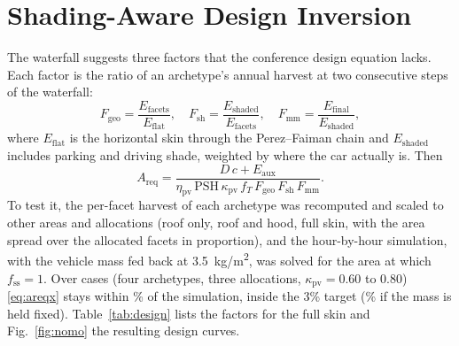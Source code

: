 \documentclass[lettersize,journal]{IEEEtran}
\newcommand{\fss}{f_{\mathrm{ss}}}
\newcommand{\Fgeo}{F_{\mathrm{geo}}}
\newcommand{\Fsh}{F_{\mathrm{sh}}}
\newcommand{\Fmm}{F_{\mathrm{mm}}}
\begin{document}
\section{Shading-Aware Design Inversion}
\label{sec:design}
The waterfall suggests three factors that the conference design equation lacks. Each factor is the ratio of an archetype's annual harvest at two consecutive steps of the waterfall:
\begin{equation}
\Fgeo=\frac{E_{\mathrm{facets}}}{E_{\mathrm{flat}}},\quad
\Fsh=\frac{E_{\mathrm{shaded}}}{E_{\mathrm{facets}}},\quad
\Fmm=\frac{E_{\mathrm{final}}}{E_{\mathrm{shaded}}},
\label{eq:factors}
\end{equation}
where $E_{\mathrm{flat}}$ is the horizontal skin through the Perez--Faiman chain and $E_{\mathrm{shaded}}$ includes parking and driving shade, weighted by where the car actually is. Then
\begin{equation}
A_{\mathrm{req}}=\frac{D\,c+E_{\mathrm{aux}}}{\eta_{\mathrm{pv}}\,\mathrm{PSH}\,\kappa_{\mathrm{pv}}\,f_T\,\Fgeo\,\Fsh\,\Fmm}.
\label{eq:areqx}
\end{equation}
To test it, the per-facet harvest of each archetype was recomputed and scaled to other areas and allocations (roof only, roof and hood, full skin, with the area spread over the allocated facets in proportion), and the hour-by-hour simulation, with the vehicle mass fed back at \SI{3.5}{kg/m^2}, was solved for the area at which $\fss=1$. Over \EsevenN{} cases (four archetypes, three allocations, $\kappa_{\mathrm{pv}}=0.60$ to 0.80) \eqref{eq:areqx} stays within \EsevenMaxErr\% of the simulation, inside the 3\% target (\EsevenMaxErrFixed\% if the mass is held fixed). Table~\ref{tab:design} lists the factors for the full skin and Fig.~\ref{fig:nomo} the resulting design curves.
\end{document}
